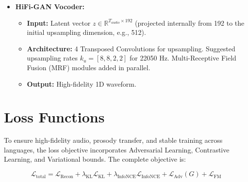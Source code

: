\documentclass[11pt]{article}
\begin{document}
\begin{itemize}[leftmargin=1.5em]
\begin{itemize}
        \item \textbf{Architecture:} 4 to 6 Affine Coupling Layers. Each coupling layer uses 4 WaveNet residual blocks with hidden dimension 192.
        \item \textbf{Output:} Maps the prior distribution to the posterior latent space $\mathbb{R}^{T_{audio} \times 192}$.
    \end{itemize}
    \item \textbf{HiFi-GAN Vocoder:}
    \begin{itemize}
        \item \textbf{Input:} Latent vector $z \in \mathbb{R}^{T_{audio} \times 192}$ (projected internally from 192 to the initial upsampling dimension, e.g., 512).
        \item \textbf{Architecture:} 4 Transposed Convolutions for upsampling. Suggested upsampling rates $k_u = [8, 8, 2, 2]$ for 22050 Hz. Multi-Receptive Field Fusion (MRF) modules added in parallel.
        \item \textbf{Output:} High-fidelity 1D waveform.
    \end{itemize}
\end{itemize}


\section{Loss Functions}

To ensure high-fidelity audio, prosody transfer, and stable training across languages, the loss objective incorporates Adversarial Learning, Contrastive Learning, and Variational bounds. The complete objective is:

\[
\mathcal{L}_{\text{total}} = \mathcal{L}_{\text{Recon}} + \lambda_{\text{KL}} \mathcal{L}_{\text{KL}} + \lambda_{\text{InfoNCE}} \mathcal{L}_{\text{InfoNCE}} + \mathcal{L}_{\text{Adv}}(G) + \mathcal{L}_{\text{FM}}
\]
\end{document}
